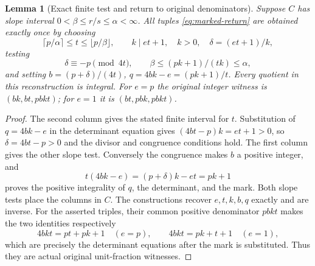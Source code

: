\documentclass[11pt]{article}
\newtheorem{lemma}[theorem]{Lemma}
\theoremstyle{definition}\newtheorem{definition}[theorem]{Definition}
\theoremstyle{remark}\newtheorem{remark}[theorem]{Remark}
\begin{document}
\begin{lemma}[Exact finite test and return to original denominators]
\label{lem:marked-finite}
Suppose \(C\) has slope interval
\(0<\beta\le r/s\le\alpha<\infty\).
All tuples \eqref{eq:marked-return} are obtained exactly
once by choosing
\[
 \lceil p/\alpha\rceil\le t\le\lfloor p/\beta\rfloor,\qquad
 k\mid et+1,\quad k>0,\quad \delta=(et+1)/k,
\]
testing
\[
 \delta\equiv-p\pmod{4t},\qquad
 \beta\le (pk+1)/(tk)\le\alpha,
\]
and setting \(b=(p+\delta)/(4t)\),
\(q=4bk-e=(pk+1)/t\).
Every quotient in this reconstruction is integral.
For \(e=p\) the original integer witness is
\((bk,bt,pbkt)\); for \(e=1\) it is
\((bt,pbk,pbkt)\).
\end{lemma}
\begin{proof}
The second column gives the stated finite interval for \(t\).
Substitution of \(q=4bk-e\) in the determinant equation gives
\((4bt-p)k=et+1>0\), so \(\delta=4bt-p>0\) and the
divisor and congruence conditions hold.  The first column
gives the other slope test.
Conversely the congruence makes \(b\) a positive integer,
and
\[
 t(4bk-e)=(p+\delta)k-et=pk+1
\]
proves the positive integrality of \(q\), the determinant,
and the mark.  Both slope tests place the columns in \(C\).
The constructions recover \(e,t,k,b,q\) exactly and are
inverse.  For the asserted triples, their common positive
denominator \(pbkt\) makes the two identities respectively
\[
 4bkt=pt+pk+1\quad(e=p),\qquad
 4bkt=pk+t+1\quad(e=1),
\]
which are precisely the determinant equations after the
mark is substituted.  Thus they are actual original
unit-fraction witnesses.
\end{proof}
\end{document}
